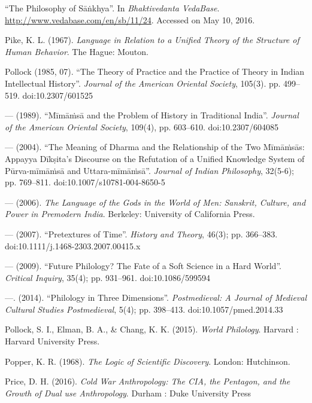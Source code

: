 \begin{thebibliography}{99}
``The Philosophy of Sāṅkhya''. In {\sl Bhaktivedanta VedaBase}. \url{http://www.vedabase.com/en/sb/11/24}. Accessed on May 10, 2016.


Pike, K. L. (1967). {\sl Language in Relation to a Unified Theory of the Structure of Human Behavior}. The Hague: Mouton.

Pollock (1985, 07). ``The Theory of Practice and the Practice of Theory in Indian Intellectual History''. {\sl Journal of the American Oriental Society}, 105(3). pp. 499--519. doi:10.2307/601525

--- (1989). ``Mīmāṁsā and the Problem of History in Traditional India''. {\sl Journal of the American Oriental Society}, 109(4), pp. 603--610. doi:10.2307/604085

--- (2004). ``The Meaning of Dharma and the Relationship of the Two Mīmāṁsās: Appayya Dīkṣita's Discourse on the Refutation of a Unified Knowledge System of Pūrva-mīmāṁsā and Uttara-mīmāṁsā''. {\sl Journal of Indian Philosophy}, 32(5-6); pp. 769--811. doi:10.1007/s10781-004-8650-5

--- (2006). {\sl The Language of the Gods in the World of Men: Sanskrit, Culture, and Power in Premodern India}. Berkeley: University of California Press.

--- (2007). ``Pretextures of Time''. {\sl History and Theory}, 46(3); pp. 366--383. doi:10.1111/j.1468-2303.2007.00415.x

--- (2009). ``Future Philology? The Fate of a Soft Science in a Hard World''. {\sl Critical Inquiry}, 35(4); pp. 931--961. doi:10.1086/599594

---. (2014). ``Philology in Three Dimensions''. {\sl Postmedieval: A Journal of Medieval Cultural Studies Postmedieval}, 5(4); pp. 398--413. doi:10.1057/pmed.2014.33

Pollock, S. I., Elman, B. A., \& Chang, K. K. (2015). {\sl World Philology}. Harvard : Harvard University Press.

Popper, K. R. (1968). {\sl The Logic of Scientific Discovery}. London: Hutchinson.

Price, D. H. (2016). {\sl Cold War Anthropology: The CIA, the Pentagon, and the Growth of Dual use Anthropology}. Durham : Duke University Press


\end{thebibliography}
